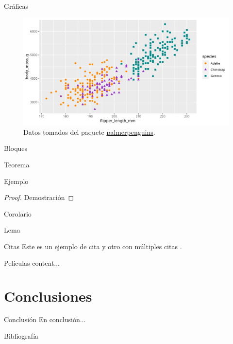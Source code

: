 \documentclass[spanish,mexico]{beamer}
\begin{document}
	\begin{frame}{Gráficas}
		\begin{figure}[h]
			\centering
			\includegraphics[width=0.9\linewidth]{plot}
			\caption{Datos tomados del paquete \href{https://education.rstudio.com/blog/2020/07/palmerpenguins-cran/\#the-palmerpenguins-package}{palmerpenguins}.}
			\label{fig:plot}
		\end{figure}
	\end{frame}
	\begin{frame}{Bloques}
	\begin{theorem}
		Teorema
	\end{theorem}
	\begin{example}
		Ejemplo
	\end{example}
	\begin{proof}
		Demostración
	\end{proof}
	\begin{corollary}
		Corolario
	\end{corollary}
	\begin{lemma}
		Lema
	\end{lemma}
\end{frame}
\begin{frame}{Citas}
	Este es un ejemplo de cita \cite{Agnarelli2021} y otro con múltiples citas \cite{Burla2020,Dodson2021,Greisman2022,Hatti2021,Joshua2020}.
\end{frame}
\begin{frame}{Películas}
	content...
\end{frame}
\section{Conclusiones}
\begin{frame}{Conclusión}
	En conclusión$\ldots$
\end{frame}
\appendix
\begin{frame}[allowframebreaks]{Bibliografía}
	\printbibliography[heading=none]
\end{frame}
\end{document}
